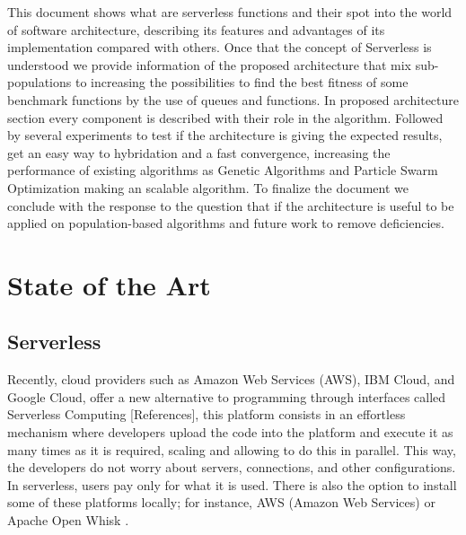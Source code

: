 \documentclass[runningheads]{llncs}
\begin{document}
This document shows what are serverless functions and their spot into the world
of software architecture, describing its features and advantages of its implementation
compared with others. Once that the concept of Serverless is understood we provide 
information of the proposed architecture that mix sub-populations to increasing the 
possibilities to find the best fitness of some benchmark functions by the use of queues and functions.
In proposed architecture section every component is described with their role in the algorithm.
Followed by several experiments to test if the architecture is giving the expected results, get an easy
way to hybridation and a fast convergence, increasing the performance of existing algorithms as Genetic Algorithms
and Particle Swarm Optimization making an scalable algorithm.
To finalize the document we conclude with the response to the question that if the architecture is useful 
to be applied on population-based algorithms and future work to remove deficiencies.


\section{State of the Art}


\subsection{Serverless}


Recently, cloud providers such as Amazon Web Services (AWS), IBM Cloud, and
Google Cloud, offer a new alternative to programming through interfaces called
Serverless Computing  [References], this platform consists in an effortless
mechanism where developers upload the code into the platform and execute it as
many times as it is required, scaling and allowing to do this in parallel. This
way, the developers do not worry about servers, connections, and other
configurations. In serverless, users pay only for what it is used. There is also
the option to install some of these platforms locally; for instance, AWS (Amazon Web Services)
\cite{Baird2016} or Apache Open Whisk \cite{Guerv2018}. 
\end{document}
